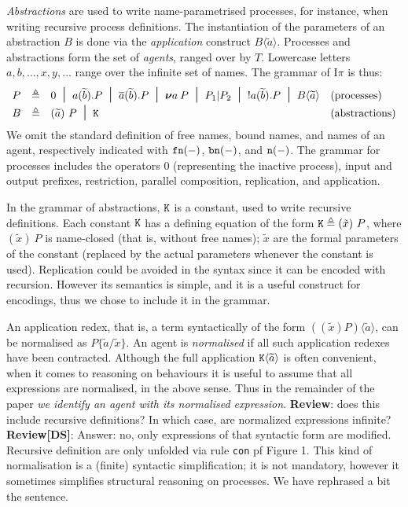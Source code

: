\documentclass[11pt,a4paper]{amsart}
\theoremstyle{plain}
\theoremstyle{definition}
\theoremstyle{defC}
\theoremstyle{thmC}
\theoremstyle{plain}
\numberwithin{equation}{section}
\newif\ifcutLMCS\cutLMCSfalse
\newcommand{\AG}{T}  %
\def\finish#1{\vskip.2cm\noindent{\em #1}%
  \marginpar{$\longleftarrow$}\vskip.2cm}
\newcommand{\finish}[1]{}
\newcommand{\trans}[1]{\mbox{{\tt #1}}}
\def\fn#1{\mbox{\tt fn}(#1)}         %
\def\bn#1{\mbox{\tt bn}(#1)}         %
\def\n#1{\mbox{\tt n}(#1)}           %
\newcommand{\obj}[1]{\langle #1 \rangle}
\def\nil{0}
\def\res#1{{\boldsymbol \nu} #1\:}   %
\def\inp#1#2{#1(#2)}
\def\bout#1#2{\overline{#1}(#2)}   %
\def\app#1#2{#1\obj{#2}}                    %
\newcommand{\rmmm}[1]{{\tt{{#1}}}}
\def\defi{\stackrel{\mbox{\scriptsize {\rm{def}}}}{=}} %
\def\midd{\; \; \mbox{\Large{$\mid$}}\;\;} %
\newcommand{\til}[1]{\widetilde{#1}}
\newcommand{\tilb}{{\til b}}
\newcommand{\tila}{{\til a}}
\newcommand{\tilx}{\tilde{x}}
\newcommand{\bind}[1]{({#1})~}
\newcommand{\myptD}{2pt}
\newcommand{\Intp}{\mbox{I$\pi$}\xspace}   %
\newcommand{\piI}{\Intp}   %
\newcommand{\gj}[1]{\finish{{\bf GJ:} #1}}
\newcommand{\gj}[1]{}
\newcommand{\defeq}{\mathrel{\triangleq}}
\newcommand{\subst}[2]{\{#2 / #1 \}}
\theoremstyle{plain}
\theoremstyle{definition}
\newcommand{\reviewComment}[1]{\textbf{Review}: {\color{red} #1}}
\newcommand{\reviewCommentDS}[1]{\textbf{Review[DS]}: {\color{green} #1}}
\newcommand{\reviewComment}[1]{}
\newcommand{\reviewCommentDS}[1]{}
\begin{document}
\emph{Abstractions} are used to write name-parametrised processes,  for
instance, when writing recursive process definitions.
 The instantiation of the parameters of an
abstraction $B$ is done via the {\em application} construct $\app B \tila$.  
Processes and abstractions form the set of \emph{agents}, ranged over by $\AG$.
Lowercase letters
$a,b, \ldots, x,y, \ldots$ range over the infinite set of names.  The grammar of \piI
 is thus:
\[\begin{array}{ccll}
  P & \defeq & \nil    \midd    \inp a \tilb . P    \midd    \bout a \tilb . P 
    \midd    \res a P \midd   P_1 |  P_2   \midd  ! \inp a \tilb . P   
  \midd \app  B \tila & \mbox{(processes)} \\[\myptD]
  B & \defeq & \bind \tila P \midd {\rmmm K} & \mbox{(abstractions)}
\end{array}\]
We omit the standard definition of free names,
bound names, and names of an agent, respectively indicated with $\fn -$, $\bn -$, and
$\n -$. The grammar for processes includes the operators  
$\nil$ (representing  the inactive process), 
input and output prefixes, restriction, parallel composition, replication, and
application.   

In the grammar of abstractions, 
${\rmmm K}$ is a constant,  used to write recursive definitions. Each
constant ${\rmmm K}$ has a defining equation of the form 
${\rmmm K} \defeq  \bind{\tilx} P$, where $\bind{\tilx} P  $ is name-closed (that is, 
without free names); $\tilx$ 
 are the formal parameters of
the constant (replaced by the actual parameters whenever the constant
is used).
Replication could be avoided in the syntax since it can be encoded
with recursion. However its semantics is simple, and it is 
a useful construct for encodings, 
thus we chose to include it in the grammar.

\ifcutLMCS
Sometimes, we use $\defi$ as an abbreviation mechanism, to
assign a name to an expression to which we want to refer later.
\gj{Is this use of $\defi$ used anywhere?}
\fi


An {application redex}, that is, a term syntactically of the form 
 $\app{((\til x) P)}{\til a}$, can be normalised as $P \subst {\til x}{\til a}$. An agent is
\emph{normalised} if all such application redexes have been
contracted.
Although the full
application $\app  {\rmmm K}{\til a} $ is often convenient, when
it comes to reasoning on behaviours 
it is useful to assume that all expressions are normalised, in the above sense.
Thus in the remainder of the paper 
\emph{we identify an agent with its normalised expression}.
\reviewComment{does this include recursive definitions? In
which case, are normalized expressions infinite?}
\reviewCommentDS{Answer: no, only expressions of that syntactic form are
  modified. Recursive definition are only unfolded via rule {\trans{con}} pf Figure 1. This
kind of normalisation is a (finite) syntactic simplification; it is not mandatory, however
it sometimes simplifies  structural reasoning  on processes. We have rephrased a bit the sentence.}
\end{document}
